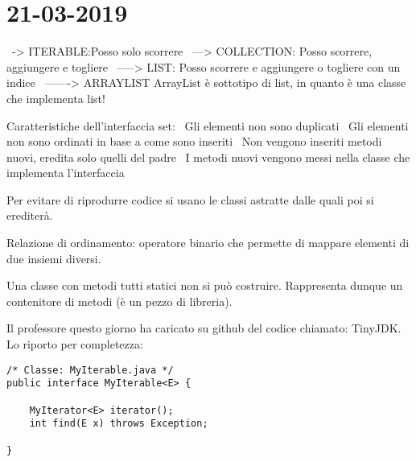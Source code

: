 

\newpage
\section{21-03-2019}
\textbullet\ -> ITERABLE:Posso solo scorrere \newline
\textbullet\ ---> COLLECTION: Posso scorrere, aggiungere e togliere \newline
\textbullet\ -----> LIST: Posso scorrere e aggiungere o togliere con un indice \newline
\textbullet\ -------> ARRAYLIST \newline
ArrayList è sottotipo di list, in quanto è una classe che implementa list! \newline
{} \newline

\noindent Caratteristiche dell'interfaccia set:\newline
\textbullet\ Gli elementi non sono duplicati \newline
\textbullet\ Gli elementi non sono ordinati in base a come sono inseriti \newline	
\textbullet\ Non vengono inseriti metodi nuovi, eredita solo quelli del padre \newline
\textbullet\ I metodi nuovi vengono messi nella classe che implementa l'interfaccia \newline

\noindent Per evitare di riprodurre codice si usano le classi astratte dalle quali poi si erediterà. 

\noindent Relazione di ordinamento: operatore binario che permette di mappare elementi di due insiemi diversi.

\noindent Una classe con metodi tutti statici non si può costruire. Rappresenta dunque un contenitore di metodi (è un pezzo di libreria).

\noindent Il professore questo giorno ha caricato su github del codice chiamato: TinyJDK. Lo riporto per completezza:
\begin{lstlisting}[basicstyle=\small,]
/* Classe: MyIterable.java */
public interface MyIterable<E> {

    MyIterator<E> iterator();
    int find(E x) throws Exception;

}
\end{lstlisting}


